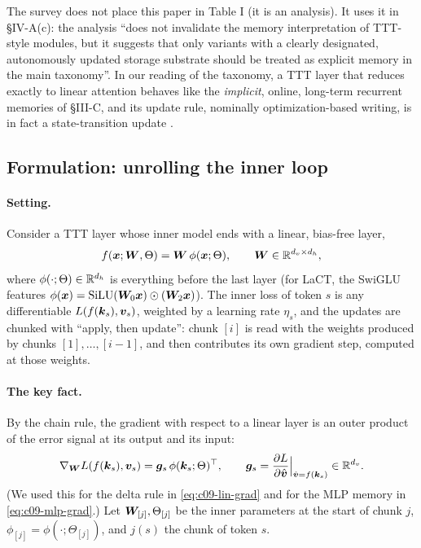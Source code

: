 \begin{taxonomy}
The survey does not place this paper in Table I (it is an analysis). It uses it in \S IV-A(c):
the analysis ``does not invalidate the memory interpretation of TTT-style modules, but it
suggests that only variants with a clearly designated, autonomously updated storage substrate
should be treated as explicit memory in the main taxonomy''. In our reading of the taxonomy, a
TTT layer that reduces exactly to linear attention behaves like the \emph{implicit},
online, long-term recurrent memories of \S III-C, and its update rule, nominally
optimization-based writing, is in fact a state-transition update \citep{zhoubian2026memory}.
\end{taxonomy}

\subsection{Formulation: unrolling the inner loop}

\paragraph{Setting.} Consider a TTT layer whose inner model ends with a linear, bias-free layer,
\begin{equation}
  f(\bm{x}; \bm{W}, \Theta) = \bm{W}\,\phi(\bm{x};\Theta), \qquad \bm{W}\in\mathbb{R}^{d_v\times d_h},
\end{equation}
where $\phi(\cdot;\Theta)\in\mathbb{R}^{d_h}$ is everything before the last layer (for LaCT, the SwiGLU
features $\phi(\bm{x}) = \operatorname{SiLU}(\bm{W}_0\bm{x})\odot(\bm{W}_2\bm{x})$). The inner loss of token $s$ is any
differentiable $L(f(\bm{k}_s), \bm{v}_s)$, weighted by a learning rate $\eta_s$, and the updates are
chunked with ``apply, then update'': chunk $[i]$ is read with the weights produced by chunks
$[1],\dots,[i-1]$, and then contributes its own gradient step, computed at those weights.

\paragraph{The key fact.} By the chain rule, the gradient with respect to a linear layer is an
outer product of the error signal at its output and its input:
\begin{equation}
  \nabla_{\bm{W}}L(f(\bm{k}_s),\bm{v}_s) = \bm{g}_s\,\phi(\bm{k}_s;\Theta)^{\top}, \qquad
  \bm{g}_s = \frac{\partial L}{\partial\hat{\bm{v}}}\Big|_{\hat{\bm{v}} = f(\bm{k}_s)} \in \mathbb{R}^{d_v}.
\end{equation}
(We used this for the delta rule in \eqref{eq:c09-lin-grad} and for the MLP memory in
\eqref{eq:c09-mlp-grad}.) Let $\bm{W}_{[j]}, \Theta_{[j]}$ be the inner parameters at the start of
chunk $j$, $\phi_{[j]} = \phi(\cdot;\Theta_{[j]})$, and $j(s)$ the chunk of token $s$.

